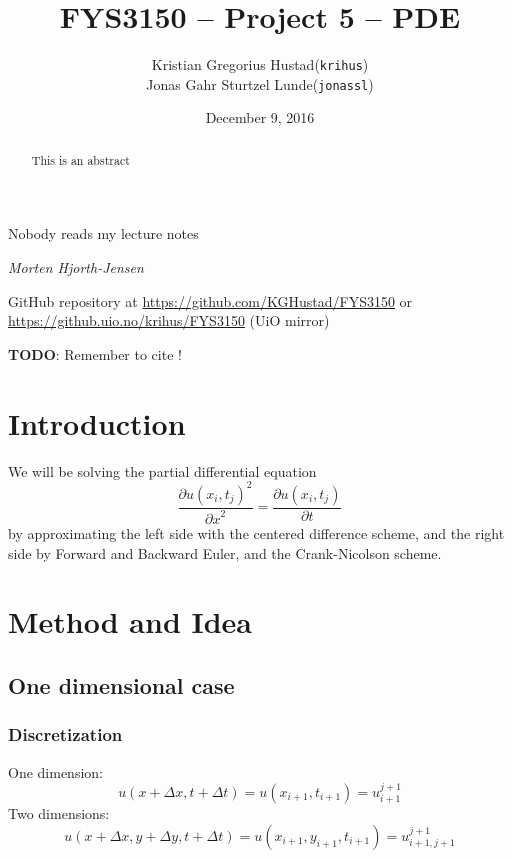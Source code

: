 \documentclass[10pt,a4paper]{article}
\newcommand{\dt}{{\Delta t}}
\newcommand{\dx}{{\Delta x}}
\newcommand{\dy}{{\Delta y}}
\newcommand{\pt}{{\partial t}}
\newcommand{\px}{{\partial x}}
\newcommand{\pu}{{\partial u}}
\begin{document}
\title{FYS3150 -- Project 5 -- PDE}
\author{
	\begin{tabular}{rl}
        Kristian Gregorius Hustad & (\texttt{krihus})\\
        Jonas Gahr Sturtzel Lunde & (\texttt{jonassl})
	\end{tabular}}
\date{December 9, 2016}
\maketitle



\setlength{\epigraphwidth}{0.75\textwidth}
\renewcommand{\epigraphflush}{center}
\renewcommand{\beforeepigraphskip}{50pt}
\renewcommand{\afterepigraphskip}{100pt}
\renewcommand{\epigraphsize}{\normalsize}
\epigraph{Nobody reads my lecture notes}
	{\textit{Morten Hjorth-Jensen}}

\begin{abstract}
\noindent
This is an abstract
\end{abstract}

\vfill


\begin{center}
    GitHub repository at \url{https://github.com/KGHustad/FYS3150}
    or \url{https://github.uio.no/krihus/FYS3150} (UiO mirror)
\end{center}


\pagebreak




\textbf{TODO}: Remember to cite \cite{hpl_fdm}!

\section{Introduction}
We will be solving the partial differential equation
\begin{equation}\label{eqn:PDE}
\frac{\pu(x_i,t_j)^2}{\px^2} = \frac{\pu(x_i,t_j)}{\pt}
\end{equation}
by approximating the left side with the centered difference scheme, and the right side by Forward and Backward Euler, and the Crank-Nicolson scheme.

\section{Method and Idea}
\subsection{One dimensional case}
\subsubsection{Discretization}\label{sec:disc}
One dimension:
\begin{equation}
u(x+\dx, t+\dt) = u(x_{i+1},t_{i+1}) = u_{i+1}^{j+1}
\end{equation}
Two dimensions:
\begin{equation}
u(x+\dx, y+\dy, t+\dt) = u(x_{i+1}, y_{i+1}, t_{i+1}) = u_{i+1,j+1}^{j+1}
\end{equation}
\end{document}
